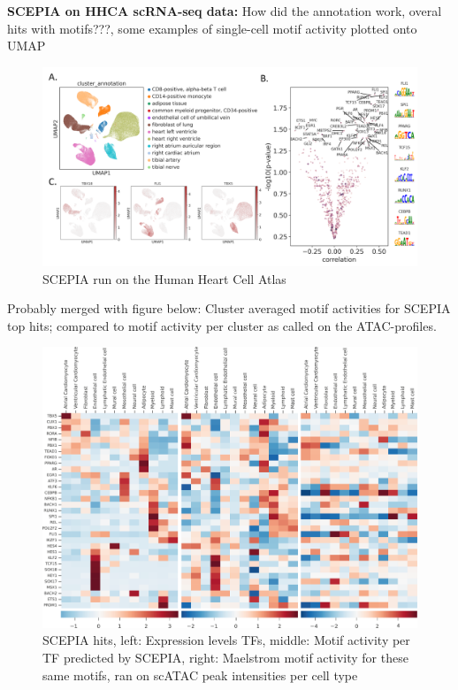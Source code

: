 \textbf{SCEPIA on HHCA scRNA-seq data: }
How did the annotation work, overal hits with motifs???, some examples of single-cell motif activity plotted onto UMAP
\begin{figure}
    \centering
    \includegraphics[width=0.75\linewidth]{ch.scepia/imgs/SCEPIAonHHCA.png}
    \caption{SCEPIA run on the Human Heart Cell Atlas}
    \label{fig:scepia_hhca}
\end{figure}



Probably merged with figure below: Cluster averaged motif activities for SCEPIA top hits; compared to motif activity per cluster as called on the ATAC-profiles.

\begin{figure}
    \centering
    \includegraphics[width=0.75\linewidth]{ch.scepia/imgs/Middel 1SCEPIAhitsHHCA.png}
    \caption{SCEPIA hits, left: Expression levels TFs, middle: Motif activity per TF predicted by SCEPIA, right: Maelstrom motif activity for these same motifs, ran on scATAC peak intensities per cell type
    }
    \label{fig:scepia_hhca}
\end{figure}

